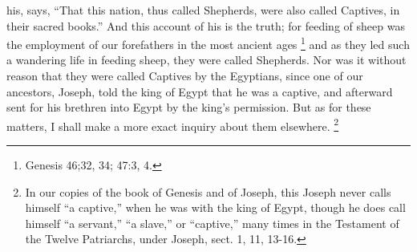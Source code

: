 his, says, ``That this nation, thus called Shepherds, were also called
Captives, in their sacred books.'' And this account of his is the truth;
for feeding of sheep was the employment of our forefathers in the most
ancient ages \footnote{Genesis 46;32, 34; 47:3,
4.} and as they led such a wandering
life in feeding sheep, they were called Shepherds. Nor was it without
reason that they were called Captives by the Egyptians, since one of our
ancestors, Joseph, told the king of Egypt that he was a captive, and
afterward sent for his brethren into Egypt by the king's permission. But
as for these matters, I shall make a more exact inquiry about them
elsewhere. \footnote{In our copies of the book
of Genesis and of Joseph, this Joseph never calls himself ``a captive,''
when he was with the king of Egypt, though he does call himself ``a
servant,'' ``a slave,'' or ``captive,'' many times in the Testament of the
Twelve Patriarchs, under Joseph, sect. 1, 11, 13-16.}

